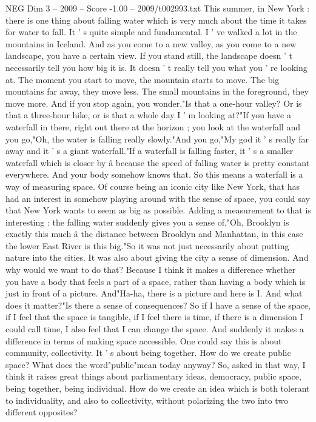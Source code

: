 \begin{textsample}{NEG Dim 3 – 2009 – Score -1.00 – 2009/t002993.txt}
This summer, in New York : there is one thing about falling water which is very much about the time it takes for water to fall.
It ' s quite simple and fundamental.
I ' ve walked a lot in the mountains in Iceland.
And as you come to a new valley, as you come to a new landscape, you have a certain view.
If you stand still, the landscape doesn ' t necessarily tell you how big it is.
It doesn ' t really tell you what you ' re looking at.
The moment you start to move, the mountain starts to move.
The big mountains far away, they move less.
The small mountains in the foreground, they move more.
And if you stop again, you wonder,"Is that a one-hour valley?
Or is that a three-hour hike, or is that a whole day I ' m looking at?"If you have a waterfall in there, right out there at the horizon ; you look at the waterfall and you go,"Oh, the water is falling really slowly."And you go,"My god it ' s really far away and it ' s a giant waterfall."If a waterfall is falling faster, it ' s a smaller waterfall which is closer by â because the speed of falling water is pretty constant everywhere.
And your body somehow knows that.
So this means a waterfall is a way of measuring space.
Of course being an iconic city like New York, that has had an interest in somehow playing around with the sense of space, you could say that New York wants to seem as big as possible.
Adding a measurement to that is interesting : the falling water suddenly gives you a sense of,"Oh, Brooklyn is exactly this much â the distance between Brooklyn and Manhattan, in this case the lower East River is this big."So it was not just necessarily about putting nature into the cities.
It was also about giving the city a sense of dimension.
And why would we want to do that?
Because I think it makes a difference whether you have a body that feels a part of a space, rather than having a body which is just in front of a picture.
And"Ha-ha, there is a picture and here is I.
And what does it matter?"Is there a sense of consequences?
So if I have a sense of the space, if I feel that the space is tangible, if I feel there is time, if there is a dimension I could call time, I also feel that I can change the space.
And suddenly it makes a difference in terms of making space accessible.
One could say this is about community, collectivity.
It ' s about being together.
How do we create public space?
What does the word"public"mean today anyway?
So, asked in that way, I think it raises great things about parliamentary ideas, democracy, public space, being together, being individual.
How do we create an idea which is both tolerant to individuality, and also to collectivity, without polarizing the two into two different opposites?

\end{textsample}
